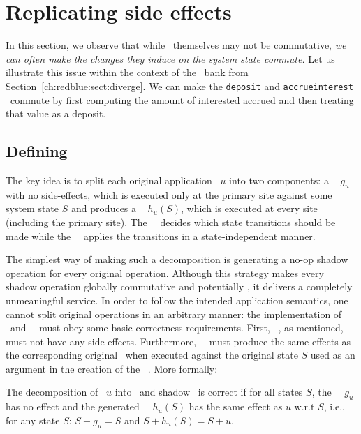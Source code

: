 \section{Replicating side effects}
\label{ch:redblue:sect:shadowops}

In this section, we observe that while \operations\ themselves
may not be commutative, \emph{we can often make the chan\-ges they
  induce on the system state commute.}  Let us illustrate this issue
within the context of the \RedBlue\ bank from Section~\ref{ch:redblue:sect:diverge}.
We can make the {\tt deposit} and {\tt accrueinterest}
\operations\ commute by first computing the amount of interested accrued
and then treating that value as a deposit.

\subsection{Defining \shadow\ \operations}
\label{sect:defineshadow}

The key idea is to split each original application \operation\ $u$
into two components: a {\em \initial\ \operation} $g_u$ with no
side-effects, which is executed only at the primary site against some
system state $S$ and produces a {\em \shadow\ \operation} $h_u(S)$,
which is executed at every site (including the primary site). The
\initial\ \operation\ decides which state transitions should be made
while the \shadow\ \operation\ applies the transitions in a
state-indep\-endent manner.

The simplest way of making such a decomposition is generating
a no-op shadow operation for every original operation. Although this strategy makes every
shadow operation globally commutative and potentially \blue,
it delivers a completely unmeaningful service. In order to follow the 
intended application semantics, one cannot
split original operations in an arbitrary manner: 
the implementation of \initial\ and \shadow\ \operations\ must obey some basic
correctness requirements. First, \initial\ \operations, as mentioned, must
not have any side effects. Furthermore, \shadow\ \operations\ must produce
the same effects as the corresponding original \operation\ when
executed against the original state $S$  used as an argument
in the creation of the \shadow\ \operation. More formally:

\begin{mydef}
The decomposition of \operation\ $u$ into \initial\ and sh\-adow
\operations\ is correct if for all states $S$, the
\initial\ \operation\ $g_u$ has no effect and the generated
\shadow\ \operation\ $h_u(S)$ has the same effect as $u$ w.r.t $S$, i.e., for
any state $S$: $S+g_u = S$ and $S+h_u(S) = S+u$.
\label{def:correctshadow}
\end{mydef}

